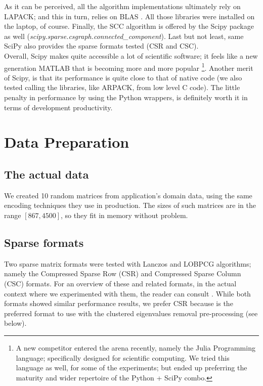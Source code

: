 As it can be perceived, all the algorithm implementations ultimately
rely on LAPACK; and this in turn, relies on BLAS \cite{blas}. All
those libraries were installed on the laptop, of course. Finally, the
SCC algorithm is offered by the Scipy package as well 
(\emph{scipy.sparse.csgraph.connected\_component}). Last but not least, same SciPy also provides the sparse formats tested (CSR and CSC). \\

Overall, Scipy makes quite accessible a lot of scientific
software; it feels like a new generation MATLAB that is becoming more
and more popular \footnote{A new competitor entered the arena
  recently, namely the Julia Programming language; specifically
  designed for scientific computing. We tried this language as well,
  for some of the experiments; but ended up preferring the maturity
  and wider repertoire of the Python + SciPy combo.}. Another merit of Scipy,
is that its performance is quite close to that of native code (we
also tested calling the libraries, like ARPACK, from low level C
code). The little penalty in performance by using the Python wrappers,
is definitely worth it in terms of development productivity. 

\section{Data Preparation}

\subsection{The actual data}
We created 10 random matrices from application's domain data, using
the same encoding techniques they use in production. The sizes of such
matrices are in the range $[867,4500]$, so they fit in memory without
problem. \\

\subsection{Sparse formats}
Two sparse matrix formats were tested with Lanczos and LOBPCG
algorithms; namely the Compressed Sparse Row (CSR) and Compressed
Sparse Column (CSC) formats. For an overview of these and related
formats, in the actual context where we experimented with them, the
reader can consult \cite{johansson15}. While both formats showed
similar performance results, we prefer CSR because is the preferred
format to use with the clustered eigenvalues removal pre-processing (see
below). 

